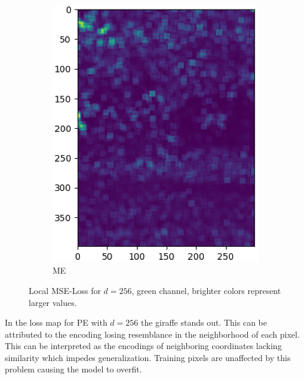 \documentclass{article}
\begin{document}
\begin{figure}[!h]
\begin{subfigure}{.2\textwidth}
    \includegraphics[width=\textwidth]{Bilder/MSE_Bilder/cropped/kernel10_magnitude_256_0.007_m0.0001_G.eps}
    \caption{ME}
    \label{MSE256ME}
  \end{subfigure}\hfill
  \caption{Local MSE-Loss for $d=256$, green channel, brighter colors represent larger values.}
  \label{MSE256}
\end{figure}

In the loss map for PE with $d=256$ the giraffe stands out. This can be attributed to the encoding losing resemblance in the neighborhood of each pixel. This can be interpreted as the encodings of neighboring coordinates lacking similarity which impedes generalization. Training pixels are unaffected by this problem causing the model to overfit.
\end{document}
